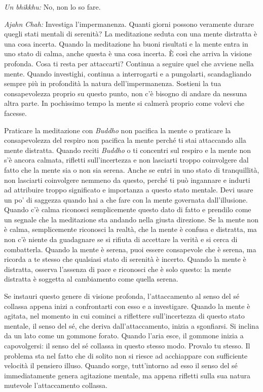 \emph{Un bhikkhu:} No, non lo so fare.

\emph{Ajahn Chah:} Investiga l'impermanenza. Quanti giorni possono veramente
durare quegli stati mentali di serenità? La meditazione seduta con una
mente distratta è una cosa incerta. Quando la meditazione ha buoni
risultati e la mente entra in uno stato di calma, anche questa è una
cosa incerta. È così che arriva la visione profonda. Cosa ti resta per
attaccarti? Continua a seguire quel che avviene nella mente. Quando
investighi, continua a interrogarti e a pungolarti, scandagliando sempre
più in profondità la natura dell'impermanenza. Sostieni la tua
consapevolezza proprio su questo punto, non c'è bisogno di andare da
nessuna altra parte. In pochissimo tempo la mente si calmerà proprio
come volevi che facesse.

Praticare la meditazione con \emph{Buddho} non pacifica la mente o
praticare la consapevolezza del respiro non pacifica la mente perché ti
stai attaccando alla mente distratta. Quando reciti \emph{Buddho} o ti
concentri sul respiro e la mente non s'è ancora calmata, rifletti
sull'incertezza e non lasciarti troppo coinvolgere dal fatto che la
mente sia o non sia serena. Anche se entri in uno stato di tranquillità,
non lasciarti coinvolgere nemmeno da questo, perché ti può ingannare e
indurti ad attribuire troppo significato e importanza a questo stato
mentale. Devi usare un po' di saggezza quando hai a che fare con la
mente governata dall'illusione. Quando c'è calma riconosci semplicemente
questo dato di fatto e prendilo come un segnale che la meditazione sta
andando nella giusta direzione. Se la mente non è calma, semplicemente
riconosci la realtà, che la mente è confusa e distratta, ma non c'è
niente da guadagnare se si rifiuta di accettare la verità e si cerca di
combatterla. Quando la mente è serena, puoi essere consapevole che è
serena, ma ricorda a te stesso che qualsiasi stato di serenità è
incerto. Quando la mente è distratta, osserva l'assenza di pace e
riconosci che è solo questo: la mente distratta è soggetta al
cambiamento come quella serena.

Se instauri questo genere di visione profonda, l'attaccamento al senso
del sé collassa appena inizi a confrontarti con esso e a investigare.
Quando la mente è agitata, nel momento in cui cominci a riflettere
sull'incertezza di questo stato mentale, il senso del sé, che deriva
dall'attaccamento, inizia a sgonfiarsi. Si inclina da un lato come un
gommone forato. Quando l'aria esce, il gommone inizia a capovolgersi: il
senso del sé collassa in questo stesso modo. Provalo tu stesso. Il
problema sta nel fatto che di solito non si riesce ad acchiappare con
sufficiente velocità il pensiero illuso. Quando sorge, tutt'intorno ad
esso il senso del sé immediatamente genera agitazione mentale, ma appena
rifletti sulla sua natura mutevole l'attaccamento collassa.

